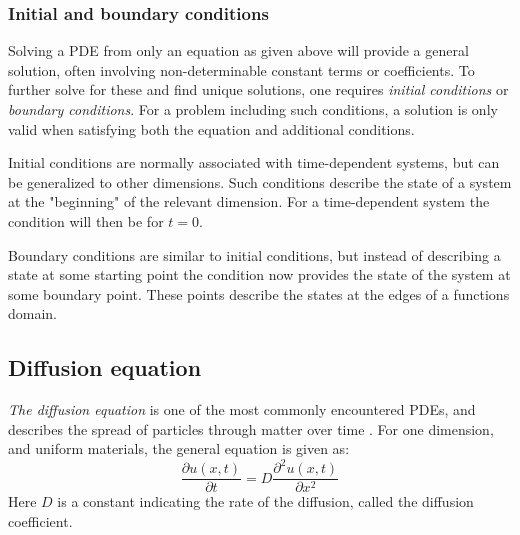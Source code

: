 \subsubsection{Initial and boundary conditions}
Solving a PDE from only an equation as given above will provide a general solution, often involving non-determinable constant terms or coefficients. To further solve for these and find unique solutions, one requires \textit{initial conditions} or \textit{boundary conditions}. For a problem including such conditions, a solution is only valid when satisfying both the equation and additional conditions. 

Initial conditions are normally associated with time-dependent systems, but can be generalized to other dimensions. Such conditions describe the state of a system at the "beginning" of the relevant dimension. For a time-dependent system the condition will then be for $t=0$. 

Boundary conditions are similar to initial conditions, but instead of describing a state at some starting point the condition now provides the state of the system at some boundary point. These points describe the states at the edges of a functions domain. 


\subsection{Diffusion equation}\label{sec:diffeq}
\textit{The diffusion equation} is one of the most commonly encountered PDEs, and describes the spread of particles through matter over time \citep[p. 18]{tveitoPDE}. For one dimension, and uniform materials, the general equation is given as:
\begin{equation}
    \frac{\partial u(x,t)}{\partial t} = D \frac{\partial^2 u(x,t)}{\partial x^2}
\end{equation}
Here $D$ is a constant indicating the rate of the diffusion, called the diffusion coefficient. 

